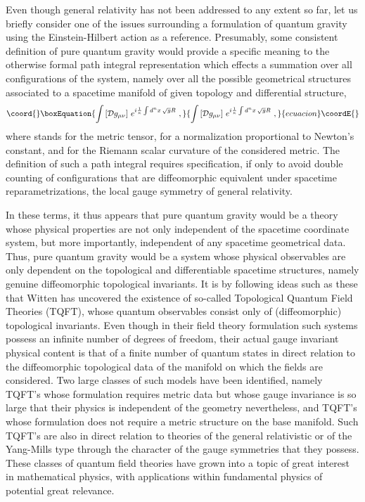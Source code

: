\documentclass[a4paper,11pt]{article}
\begin{document}
Even though general relativity has not been addressed to any extent so far,
let us briefly consider one of the issues surrounding a formulation of
quantum gravity using the Einstein-Hilbert action as a reference.
Presumably, some consistent definition of pure quantum gravity would
provide a specific meaning to the otherwise formal path integral
representation which effects a summation over all configurations of
the system, namely over all the possible geometrical structures associated
to a spacetime manifold of given topology and differential structure,
\begin{equation}\coord{}\boxEquation{
\int\left[{\cal D}g_{\mu\nu}\right]\,
e^{i\frac{1}{\kappa}\int d^nx\,\sqrt{g}R}\ ,
}{
\int\left[{\cal D}g_{\mu\nu}\right]\,
e^{i\frac{1}{\kappa}\int d^nx\,\sqrt{g}R}\ ,
}{ecuacion}\coordE{}\end{equation}
where \coordHE{} stands for the metric tensor, \myHighlight{$\kappa$}\coordHE{} for a normalization
proportional to Newton's constant, and \coordHE{} for the Riemann scalar curvature
of the con\-si\-de\-red metric. The definition of such a path integral requires
specification, if only to avoid double counting of configurations that
are diffeomorphic equivalent under spacetime reparametrizations, the local
gauge symmetry of general relativity.

In these terms, it thus appears that pure quantum gravity would be a theory 
whose physical properties are not only independent of the spacetime coordinate
system, but more importantly, independent of any spacetime geometrical
data.\cite{Wit1,Wit2} Thus, pure quantum gravity would be a system whose 
physical observables are only dependent on the topological and differentiable
spacetime structures, namely genuine diffeomorphic topological invariants.
It is by following ideas such as these that Witten has uncovered the
existence of so-called Topological Quantum Field Theories (TQFT), whose
quantum observables consist only of (diffeomorphic) topological 
invariants.\cite{Wit1,Wit2,TQFT}
Even though in their field theory formulation such systems possess an
infinite number of degrees of freedom, their actual gauge invariant
physical content is that of a finite number of quantum states in direct
relation to the diffeomorphic topological data of the manifold on which
the fields are considered. Two large classes of such models have been
identified,\cite{TQFT} namely TQFT's whose formulation requires metric data 
but whose gauge invariance is so large that their physics is independent
of the geometry nevertheless, and TQFT's whose formulation does not
require a metric structure on the base manifold. Such TQFT's are also
in direct relation to theories of the general relativistic or of the
Yang-Mills type through the character of the gauge symmetries that they 
possess. These classes of quantum field theories have grown into a topic
of great interest in mathematical physics, with applications
within fundamental physics of potential great relevance.
\end{document}
